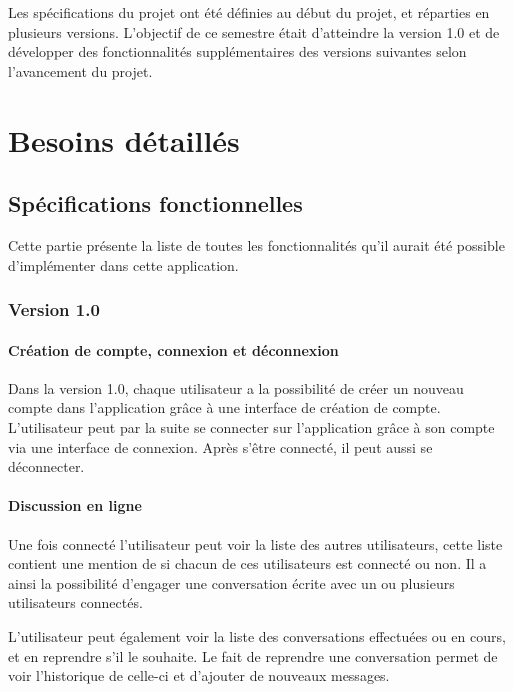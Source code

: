 Les spécifications du projet ont été définies au début du projet, et réparties en plusieurs versions. L'objectif de ce semestre était d'atteindre la version 1.0 et de développer des fonctionnalités supplémentaires des versions suivantes selon l'avancement du projet.

\section{Besoins détaillés}

\subsection{Spécifications fonctionnelles}

Cette partie présente la liste de toutes les fonctionnalités qu'il aurait été possible d'implémenter dans cette application.

\subsubsection{Version 1.0}

\paragraph{Création de compte, connexion et déconnexion\newline} 

\par Dans la version 1.0, chaque utilisateur a la possibilité de créer un nouveau compte dans l’application grâce à une interface de création de compte. L’utilisateur peut par la suite se connecter sur l’application grâce à son compte via une interface de connexion. Après s'être connecté, il peut aussi se déconnecter. 


\paragraph{Discussion en ligne\newline} 

\par Une fois connecté l'utilisateur peut voir la liste des autres utilisateurs, cette liste contient une mention de si chacun de ces utilisateurs est connecté ou non. Il a ainsi la possibilité d’engager une conversation écrite avec un ou plusieurs utilisateurs connectés. 

\par L’utilisateur peut également voir la liste des conversations effectuées ou en cours, et en reprendre s'il le souhaite. Le fait de reprendre une conversation permet de voir l’historique de celle-ci et d’ajouter de nouveaux messages. 

